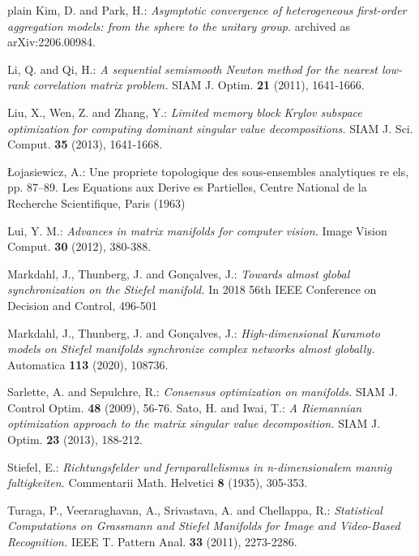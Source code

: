 \documentclass[11pt,reqno]{amsart}
\numberwithin{figure}{section}
\begin{document}
\begin{thebibliography}{plain}
 Kim, D. and   Park, H.: \textit{Asymptotic convergence of heterogeneous first-order aggregation models: from the sphere to the unitary group.} archived as arXiv:2206.00984. 


 Li, Q. and Qi, H.: \textit{A sequential semismooth Newton method for the nearest low-rank correlation matrix problem.} SIAM J. Optim. {\bf21} (2011), 1641-1666. 



 Liu, X., Wen, Z. and Zhang, Y.: \textit{Limited memory block Krylov subspace optimization for computing dominant singular value decompositions.}  SIAM J. Sci. Comput. {\bf35} (2013), 1641-1668.

 \L ojasiewicz, A.: Une propriete topologique des sous-ensembles analytiques re els, pp. 87–89. Les Equations aux Derive es Partielles, Centre National de la Recherche Scientifique, Paris (1963)


 Lui, Y. M.: \textit{Advances in matrix manifolds for computer vision.} Image Vision Comput. {\bf30} (2012), 380-388. 


 Markdahl, J., Thunberg, J. and Gon\c{c}alves, J.: \textit{Towards almost global synchronization on the Stiefel manifold.} In 2018 56th IEEE Conference on Decision and Control, 496-501


 Markdahl, J., Thunberg, J. and Gon\c{c}alves, J.: \textit{High-dimensional Kuramoto models on Stiefel manifolds synchronize complex networks almost globally.} Automatica {\bf113} (2020), 108736.

 Sarlette, A. and Sepulchre, R.: \textit{Consensus optimization on manifolds.} SIAM J. Control Optim. {\bf48} (2009), 56-76.
 Sato, H. and Iwai, T.: \textit{A Riemannian optimization approach to the matrix singular value decomposition.} SIAM J. Optim. {\bf23} (2013), 188-212. 

 Stiefel, E.: \textit{Richtungsfelder und fernparallelismus in n-dimensionalem mannig faltigkeiten.} Commentarii Math. Helvetici {\bf8} (1935), 305-353. 

 Turaga, P., Veeraraghavan, A., Srivastava, A. and Chellappa, R.: \textit{Statistical Computations on Grassmann and Stiefel Manifolds for Image and Video-Based Recognition.} 	IEEE T. Pattern Anal. {\bf33} (2011), 2273-2286. 



\end{thebibliography}
\end{document}

